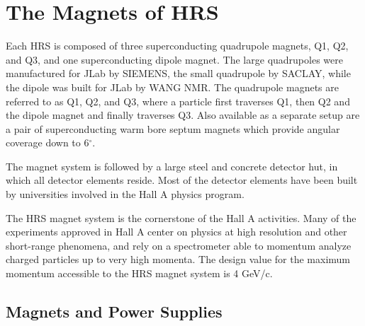 

\section{The Magnets of HRS}

Each HRS is composed of three superconducting quadrupole magnets, Q1, Q2, 
and Q3, and one superconducting dipole magnet.  The large quadrupoles were 
manufactured for JLab by SIEMENS, the small quadrupole by SACLAY, while 
the dipole was built for JLab by WANG NMR.  The quadrupole magnets are 
referred to as Q1, Q2, and Q3, where a particle first traverses Q1, then 
Q2 and the dipole magnet and finally traverses Q3. Also available as a separate
setup are a pair of superconducting warm bore septum magnets which provide
 angular coverage down to 6$^{\circ}$. 

The magnet system is followed by a large steel and concrete detector 
hut, in which all detector elements reside.  Most of the 
detector elements have been built by universities involved in the Hall A 
physics program.

The HRS magnet system is the cornerstone of the Hall A activities.  
Many of the experiments approved in Hall A center on physics at high 
resolution and other short-range phenomena, and rely on a spectrometer 
able to momentum analyze charged particles up to very high momenta.  The 
design value for the maximum momentum accessible to the HRS magnet 
system is 4 GeV/c.

\subsection{Magnets and Power Supplies}

